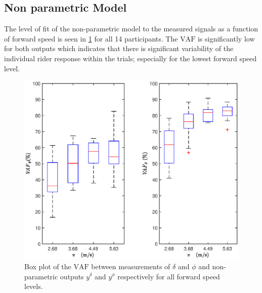 \subsection{Non parametric Model}
The level of fit of the non-parametric model to the measured signals as a function of forward speed is seen in \cref{fig:FIT_FIR} for all 14 participants. The \ensuremath{\mathrm{VAF}} is significantly low for both outputs which indicates that there is significant variability of the individual rider response within the trials; especially for the lowest forward speed level. 
\begin{figure}[h!]
    \centering
 
    \includegraphics[width=\linewidth]{images/steer_irf/FIT_irf_steer.eps}
    \caption{Box plot of the  \ensuremath{\mathrm{VAF}} between measurements of \ensuremath{\delta} and \ensuremath{\phi} and non-parametric outputs \ensuremath{y^\delta} and \ensuremath{y^\phi} respectively for all forward speed levels.}
    \label{fig:FIT_FIR}
\end{figure}
 
